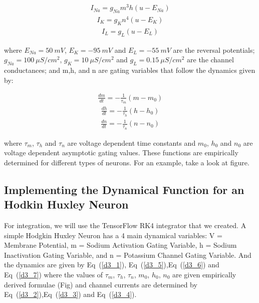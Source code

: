 \documentclass[10pt,letterpaper]{article}
\begin{document}
\begin{eqnarray}\label{d3_2}I_{Na} = g_{Na}m^3h(u−E_{Na})\end{eqnarray}
\begin{eqnarray}\label{d3_3}I_K = g_Kn^4(u−E_K)\end{eqnarray}
\begin{eqnarray}\label{d3_4}I_L = g_L(u−E_L)\end{eqnarray}

where $E_{Na}=50\ mV$, $E_K = -95\ mV$ and $E_L=-55\ mV$ are the reversal potentials; $g_{Na} = 100\ \mu S/cm^2$, $g_K = 10\ \mu S/cm^2$ and $g_L = 0.15\ \mu S/cm^2$ are the channel conductances; and m,h, and n are gating variables that follow the dynamics given by:

\begin{eqnarray}\label{d3_5}\frac{dm}{dt} = - \frac{1}{\tau_m}(m-m_0)\end{eqnarray}
\begin{eqnarray}\label{d3_6}\frac{dh}{dt} = - \frac{1}{\tau_h}(h-h_0)\end{eqnarray}
\begin{eqnarray}\label{d3_7}\frac{dn}{dt} = - \frac{1}{\tau_n}(n-n_0)\end{eqnarray}

where $\tau_m$, $\tau_h$ and $\tau_n$ are voltage dependent time constants and $m_0$, $h_0$ and $n_0$ are voltage dependent asymptotic gating values. These functions are empirically determined for different types of neurons. For an example, take a look at figure.

\subsection*{Implementing the Dynamical Function for an Hodkin Huxley Neuron}

For integration, we will use the TensorFlow RK4 integrator that we created. A simple Hodgkin Huxley Neuron has a 4 main dynamical variables: V = Membrane Potential, m = Sodium Activation Gating Variable, h = Sodium Inactivation Gating Variable, and n = Potassium Channel Gating Variable. And the dynamics are given by Eq~(\ref{d3_1}), Eq~(\ref{d3_5}),Eq~(\ref{d3_6}) and Eq~(\ref{d3_7}) where the values of $\tau_m$, $\tau_h$, $\tau_n$, $m_0$, $h_0$, $n_0$ are given empirically derived formulae (Fig) and channel currents are determined by Eq~(\ref{d3_2}),Eq~(\ref{d3_3}) and Eq~(\ref{d3_4}).
\end{document}
